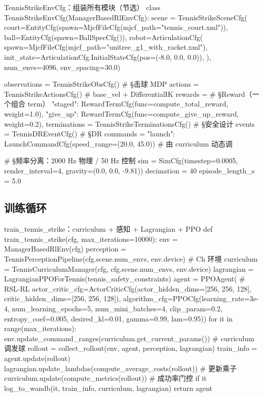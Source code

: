 \begin{codebox}[Python]{TennisStrikeEnvCfg：组装所有模块（节选）}
class TennisStrikeEnvCfg(ManagerBasedRlEnvCfg):
    scene = TennisStrikeSceneCfg(
        court=EntityCfg(spawn=MjcfFileCfg(mjcf_path="tennis_court.xml")),
        ball=EntityCfg(spawn=BallSpecCfg()),
        robot=ArticulationCfg(
            spawn=MjcfFileCfg(mjcf_path="unitree_g1_with_racket.xml"),
            init_state=ArticulationCfg.InitialStateCfg(pos=(-8.0, 0.0, 0.0)),
        ),
        num_envs=4096, env_spacing=30.0)

    observations = TennisStrikeObsCfg()        # §击球 MDP
    actions = TennisStrikeActionsCfg()         # base_vel + DifferentialIK
    rewards = {                                # §Reward（一个组合 term）
        "staged": RewardTermCfg(func=compute_total_reward, weight=1.0),
        "give_up": RewardTermCfg(func=compute_give_up_reward, weight=0.2),
    }
    terminations = TennisStrikeTerminationsCfg()  # §安全设计
    events = TennisDREventCfg()                    # §DR
    commands = {"launch": LaunchCommandCfg(speed_range=(20.0, 45.0))}  # 由 curriculum 动态调

    # §频率分离：2000 Hz 物理 / 50 Hz 控制
    sim = SimCfg(timestep=0.0005, render_interval=4, gravity=(0.0, 0.0, -9.81))
    decimation = 40
    episode_length_s = 5.0
\end{codebox}

\subsection{训练循环}

\begin{codebox}[Python]{train\_tennis\_strike：curriculum + 感知 + Lagrangian + PPO}
def train_tennis_strike(cfg, max_iterations=10000):
    env = ManagerBasedRlEnv(cfg)
    perception = TennisPerceptionPipeline(cfg.scene.num_envs, env.device)  # Ch 环境
    curriculum = TennisCurriculumManager(cfg, cfg.scene.num_envs, env.device)
    lagrangian = LagrangianPPOForTennis(tennis_safety_constraints)
    agent = PPOAgent(                                  # RSL-RL
        actor_critic_cfg=ActorCriticCfg(actor_hidden_dims=[256, 256, 128],
                                        critic_hidden_dims=[256, 256, 128]),
        algorithm_cfg=PPOCfg(learning_rate=3e-4, num_learning_epochs=5,
                             num_mini_batches=4, clip_param=0.2,
                             entropy_coef=0.005, desired_kl=0.01,
                             gamma=0.99, lam=0.95))
    for it in range(max_iterations):
        env.update_command_ranges(curriculum.get_current_params())  # curriculum 调发球
        rollout = collect_rollout(env, agent, perception, lagrangian)
        train_info = agent.update(rollout)
        lagrangian.update_lambdas(compute_average_costs(rollout))    # 更新乘子
        curriculum.update(compute_metrics(rollout))                 # 成功率门控
        if it %
            log_to_wandb(it, train_info, curriculum, lagrangian)
    return agent
\end{codebox}

